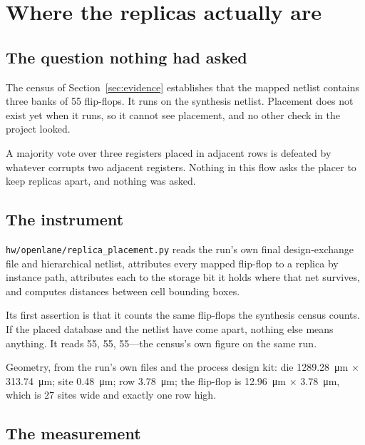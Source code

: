 \documentclass[11pt,a4paper]{article}
\newcommand{\file}[1]{\texttt{\small #1}}
\begin{document}
\section{Where the replicas actually are}
\label{sec:placement}

\subsection{The question nothing had asked}

The census of Section~\ref{sec:evidence} establishes that the mapped
netlist contains three banks of 55 flip-flops. It runs on the synthesis
netlist. Placement does not exist yet when it runs, so it cannot see
placement, and no other check in the project looked.

A majority vote over three registers placed in adjacent rows is defeated
by whatever corrupts two adjacent registers. Nothing in this flow asks
the placer to keep replicas apart, and nothing was asked.

\subsection{The instrument}

\file{hw/openlane/replica\_placement.py} reads the run's own final
design-exchange file and hierarchical netlist, attributes every mapped
flip-flop to a replica by instance path, attributes each to the storage
bit it holds where that net survives, and computes distances between cell
bounding boxes.

Its first assertion is that it counts the same flip-flops the synthesis
census counts. If the placed database and the netlist have come apart,
nothing else means anything. It reads 55, 55, 55---the census's own
figure on the same run.

Geometry, from the run's own files and the process design kit: die
\SI{1289.28}{\micro\meter} $\times$ \SI{313.74}{\micro\meter}; site
\SI{0.48}{\micro\meter}; row \SI{3.78}{\micro\meter}; the flip-flop is
\SI{12.96}{\micro\meter} $\times$ \SI{3.78}{\micro\meter}, which is 27
sites wide and exactly one row high.

\subsection{The measurement}
\end{document}
